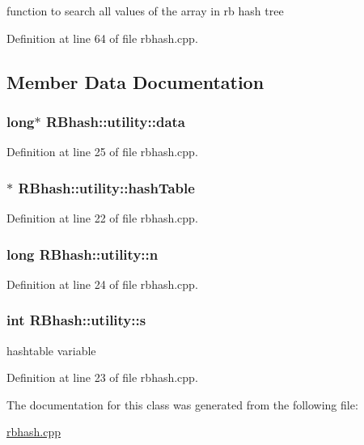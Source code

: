function to search all values of the array in rb hash tree 



Definition at line 64 of file rbhash.\-cpp.



\subsection{Member Data Documentation}
\hypertarget{class_r_bhash_1_1utility_a2d975c723f3a42aa6c174034d16544a5}{
\subsubsection[{data}]{\setlength{\rightskip}{0pt plus 5cm}long$\ast$ R\-Bhash\-::utility\-::data}}\label{class_r_bhash_1_1utility_a2d975c723f3a42aa6c174034d16544a5}


Definition at line 25 of file rbhash.\-cpp.

\hypertarget{class_r_bhash_1_1utility_aa57c2af866fe11f3d2b84fd5c7669d14}{
\subsubsection[{hash\-Table}]{$\ast$ R\-Bhash\-::utility\-::hash\-Table}}\label{class_r_bhash_1_1utility_aa57c2af866fe11f3d2b84fd5c7669d14}


Definition at line 22 of file rbhash.\-cpp.

\hypertarget{class_r_bhash_1_1utility_aa3e63fea701cf99046aeab691ba4da41}{
\subsubsection[{n}]{\setlength{\rightskip}{0pt plus 5cm}long R\-Bhash\-::utility\-::n}}\label{class_r_bhash_1_1utility_aa3e63fea701cf99046aeab691ba4da41}


Definition at line 24 of file rbhash.\-cpp.

\hypertarget{class_r_bhash_1_1utility_a5674754a0754872a1c2a2931f5495a21}{
\subsubsection[{s}]{\setlength{\rightskip}{0pt plus 5cm}int R\-Bhash\-::utility\-::s}}\label{class_r_bhash_1_1utility_a5674754a0754872a1c2a2931f5495a21}


hashtable variable 



Definition at line 23 of file rbhash.\-cpp.



The documentation for this class was generated from the following file\-:\begin{DoxyCompactItemize}
\item 
\hyperlink{rbhash_8cpp}{rbhash.\-cpp}\end{DoxyCompactItemize}
